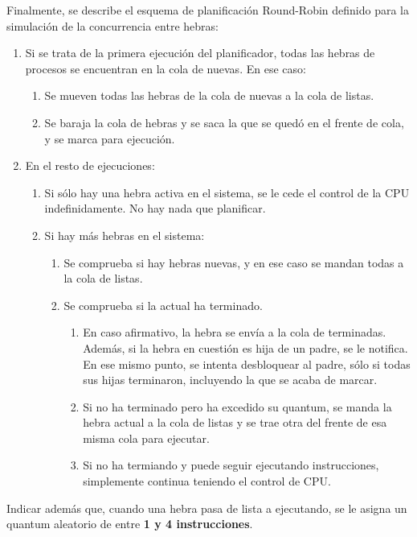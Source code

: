 Finalmente, se describe el esquema de planificación Round-Robin definido para la simulación de la concurrencia entre hebras:
\begin{enumerate}
    \item Si se trata de la primera ejecución del planificador, todas las hebras de procesos se encuentran en la cola de nuevas. En ese caso:
    \begin{enumerate}
        \item Se mueven todas las hebras de la cola de nuevas a la cola de listas.
        \item Se baraja la cola de hebras y se saca la que se quedó en el frente de cola, y se marca para ejecución.
    \end{enumerate}
    \item En el resto de ejecuciones:
    \begin{enumerate}
        \item Si sólo hay una hebra activa en el sistema, se le cede el control de la CPU indefinidamente. No hay nada que planificar.
        \item Si hay más hebras en el sistema:
        \begin{enumerate}
            \item Se comprueba si hay hebras nuevas, y en ese caso se mandan todas a la cola de listas.
            \item Se comprueba si la actual ha terminado.
            \begin{enumerate}
                \item En caso afirmativo, la hebra se envía a la cola de terminadas. Además, si la hebra en cuestión es hija de un padre, se le notifica.
                En ese mismo punto, se intenta desbloquear al padre, sólo si todas sus hijas terminaron, incluyendo la que se acaba de marcar.
                \item Si no ha terminado pero ha excedido su quantum, se manda la hebra actual a la cola de listas y se trae otra del frente de esa misma cola para ejecutar.
                \item Si no ha termiando y puede seguir ejecutando instrucciones, simplemente continua teniendo el control de CPU.
            \end{enumerate}
        \end{enumerate}
    \end{enumerate}
\end{enumerate}

Indicar además que, cuando una hebra pasa de lista a ejecutando, se le asigna un quantum aleatorio de entre \textbf{1 y 4 instrucciones}.

